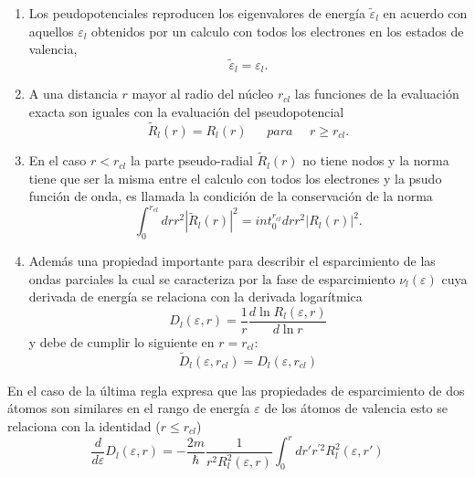 \documentclass[12pt,a4paper, oneside]{book}
\begin{document}
   \begin{enumerate}
   	\item Los peudopotenciales reproducen los eigenvalores de energ\'ia $\tilde{\varepsilon}_l$ en acuerdo con aquellos $\varepsilon_l$ obtenidos por un calculo con todos los electrones en los estados de valencia,
   	\begin{equation*}
   	\tilde{\varepsilon}_l = \varepsilon_l.
   	\end{equation*}  
   	\item A una distancia $r$ mayor al radio del n\'ucleo $r_{cl}$ las funciones de la evaluaci\'on exacta son iguales con la evaluaci\'on del pseudopotencial
   	\begin{equation*}
   	\tilde{R}_l (r) = R_l (r)~~~~~~~para~~~~~~r\ge r_{cl}.
   	\end{equation*}
   	\item \label{listNorm}En el caso $r < r_{cl}$ la parte pseudo-radial $\tilde{R}_l (r)$ no tiene nodos y la norma tiene que ser la misma entre el calculo con todos los electrones y la psudo funci\'on de onda, es llamada la condici\'on de la conservaci\'on de la norma
   	\begin{equation*}
   	\int_{0}^{r_{cl}} dr r^2 |\tilde{R}_l (r)|^2 = int_{0}^{r_{cl}} dr r^2 |R_l (r)|^2.
   	\end{equation*}
   	\item Adem\'as una propiedad importante para describir el esparcimiento de las ondas parciales la cual se caracteriza por la fase de esparcimiento $\nu_l (\varepsilon)$ cuya derivada de energ\'ia se relaciona con la derivada logar\'itmica 
   	\begin{equation*}
   	D_l (\varepsilon, r) = \frac{1}{r} \frac{d \ln R_l (\varepsilon, r)}{d \ln r}
   	\end{equation*}
   	y debe de cumplir lo siguiente en $r=r_{cl}$:
   	\begin{equation*}
   	\tilde{D}_l (\varepsilon, r_{cl})= D_l (\varepsilon, r_{cl}) 
   	\end{equation*}
   	
   \end{enumerate}
   En el caso de la \'ultima regla expresa que las propiedades de esparcimiento de dos \'atomos son similares en el rango de energ\'ia $\varepsilon$ de los \'atomos de valencia esto se relaciona con la identidad ($r \le r_{cl} $)
   \begin{equation}
   \frac{d}{d \varepsilon} D_l (\varepsilon, r) = - \frac{2 m }{\hbar} \frac{1}{r^2 R_l ^2 (\varepsilon, r)} \int_{0}^{r} dr' r^{'2} R_l ^2 (\varepsilon, r') \label{ec:freidelSum} 
   \end{equation}
\end{document}
